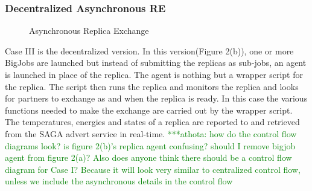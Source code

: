 \documentclass[a4paper,10pt]{article}
\newcommand{\athotanote}[1]{ {\textcolor{green} { ***athota: #1 }}}
\newcommand{\athotanote}[1]{}
\begin{document}
\subsubsection{Decentralized Asynchronous RE}

\begin{figure}
\centering


\caption{\small Asynchronous Replica Exchange}
\label{fig:decentralized}
\end{figure}

Case III is the decentralized version. In this version(Figure 2(b)), one or more BigJobs are launched but instead of submitting the replicas as sub-jobs, an agent is launched in place of the replica. The agent is nothing but a wrapper script for the replica. The script then runs the replica and monitors the replica and looks for partners to exchange as and when the replica is ready. In this case the various functions needed to make the exchange are carried out by the wrapper script. The temperatures, energies and states of a replica are reported to and retrieved from the SAGA advert service in real-time. \athotanote{how do the control flow diagrams look? is figure 2(b)'s replica agent confusing? should I remove bigjob agent from figure 2(a)? Also does anyone think there should be a control flow diagram for Case I? Because it will look very similar to centralized control flow, unless we include the asynchronous details in the control flow }
\end{document}
